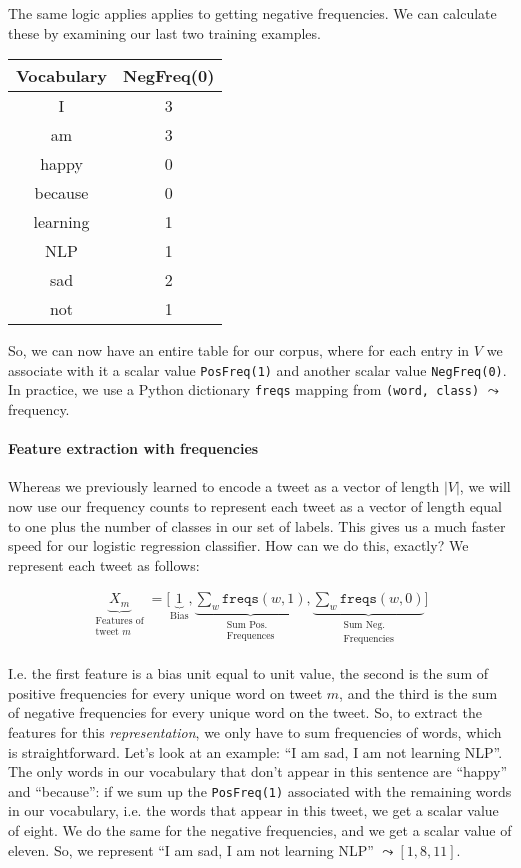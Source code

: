 \documentclass[12pt]{article}
\begin{document}
The same logic applies applies to getting negative frequencies. We can calculate these by examining our last two training examples.


\begin{center}
  \begin{tabular}{c c}
    \hline
    Vocabulary & NegFreq(0) \\
    \hline
    I  & 3 \\
    am & 3 \\
    happy & 0 \\
    because & 0 \\
    learning & 1 \\
    NLP & 1 \\
    sad & 2 \\
    not & 1
  \end{tabular}
\end{center}

So, we can now have an entire table for our corpus, where for each entry in $V$ we associate with it a scalar value \texttt{PosFreq(1)} and another scalar value \texttt{NegFreq(0)}. In practice, we use a Python dictionary \texttt{freqs} mapping from \texttt{(word, class)} $\leadsto$ frequency.

\paragraph{Feature extraction with frequencies} Whereas we previously learned to encode a tweet as a vector of length $|V|$, we will now use our frequency counts to represent each tweet as a vector of length equal to one plus the number of classes in our set of labels. This gives us a much faster speed for our logistic regression classifier. How can we do this, exactly? We represent each tweet as follows:

\begin{align*}
\underbrace{X_m}_{\substack{\textrm{Features of} \\ \textrm{tweet } m}} = \bigg [ \underbrace{1}_{\textrm{Bias}}, \underbrace{\sum_w \texttt{freqs}(w, 1)}_{\substack{\textrm{Sum Pos.} \\ \textrm{Frequences}}}, \underbrace{\sum_w \texttt{freqs}(w, 0)}_{\substack{\textrm{Sum Neg.} \\ \textrm{Frequencies}}} \bigg ]
\end{align*}

I.e. the first feature is a bias unit equal to unit value, the second is the sum of positive frequencies for every unique word on tweet $m$, and the third is the sum of negative frequencies for every unique word on the tweet.
So, to extract the features for this \emph{representation}, we only have to sum frequencies of words, which is straightforward. Let's look at an example: ``I am sad, I am not learning NLP''. The only words in our vocabulary that don't appear in this sentence are ``happy'' and ``because'': if we sum up the \texttt{PosFreq(1)} associated with the remaining words in our vocabulary, i.e. the words that appear in this tweet, we get a scalar value of eight. We do the same for the negative frequencies, and we get a scalar value of eleven. So, we represent ``I am sad, I am not learning NLP'' $\leadsto [1, 8, 11]$.
\end{document}
